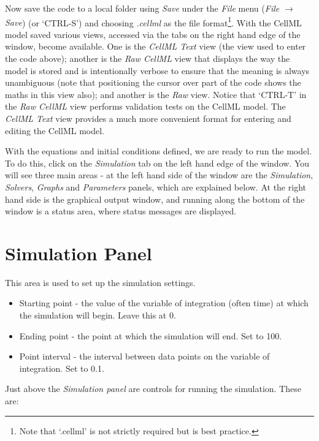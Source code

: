 \documentclass[a4paper,10pt,english]{sphinxmanual}
\begin{document}
Now save the code to a local folder using \emph{Save} under the \emph{File} menu (\emph{File \(\rightarrow\) Save})
(or ‘CTRL-S’) and choosing \emph{.cellml} as the file format\footnote[6]{
Note that ‘.cellml’ is not strictly required but is best practice.
}. With the
CellML model saved various views, accessed via the tabs on the right
hand edge of the window, become available. One is the \emph{CellML Text} view
(the view used to enter the code above); another is the \emph{Raw CellML}
view that displays the way the model is stored and is intentionally
verbose to ensure that the meaning is always unambiguous (note that
positioning the cursor over part of the code shows the maths in this
view also); and another is the \emph{Raw} view. Notice that ‘CTRL-T’ in the
\emph{Raw CellML} view performs validation tests on the CellML model. The
\emph{CellML Text} view provides a much more convenient format for entering
and editing the CellML model.

With the equations and initial conditions defined, we are ready to run
the model. To do this, click on the \emph{Simulation} tab on the left hand
edge of the window. You will see three main areas - at the left hand
side of the window are the \emph{Simulation}, \emph{Solvers}, \emph{Graphs} and
\emph{Parameters} panels, which are explained below. At the right hand side
is the graphical output window, and running along the bottom of the
window is a status area, where status messages are displayed.


\section{Simulation Panel}
\label{create_and_first_run:simulation-panel}
This area is used to set up the simulation settings.
\begin{itemize}
\item {} 
Starting point - the value of the variable of integration (often
time) at which the simulation will begin. Leave this at 0.

\item {} 
Ending point - the point at which the simulation will end. Set to
100.

\item {} 
Point interval - the interval between data points on the variable of
integration. Set to 0.1.

\end{itemize}

Just above the \emph{Simulation panel} are controls for running the
simulation. These are:
\end{document}
